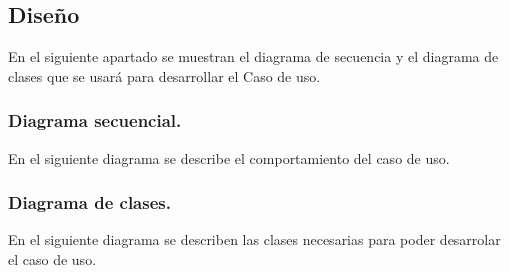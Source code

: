 \subsection{Diseño}
En el siguiente apartado se muestran el diagrama de secuencia y el diagrama de clases que se usará para desarrollar el Caso de uso.

\subsubsection{Diagrama secuencial.}
	En el siguiente diagrama se describe el comportamiento del caso de uso.


\subsubsection{Diagrama de clases.}
	En el siguiente diagrama se describen las clases necesarias para poder desarrolar el caso de uso.

